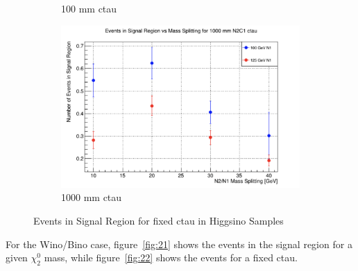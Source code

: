 \documentclass{article}
\begin{document}
\begin{figure} [H]
\begin{subfigure}{.5\textwidth}
  \caption{100 mm ctau}
  \label{fig:sub-third18}
\end{subfigure}
\begin{subfigure}{.5\textwidth}
  \centering
  \includegraphics[width=.8\linewidth]{1000mm.png}  
  \caption{1000 mm ctau}
  \label{fig:sub-fourth18}
\end{subfigure}
\caption{Events in Signal Region for fixed ctau in Higgsino Samples}
\label{fig:20}
\end{figure}
\par
For the Wino/Bino case, figure~\ref{fig:21} shows the events in the signal region for a given $\chi_{2}^{0}$ mass, while figure~\ref{fig:22} shows the events for a fixed ctau.
\par
\end{document}
